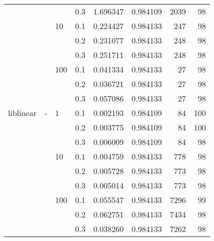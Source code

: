\begin{table}[H]
\begin{tabular}{llllrrrr}
          &   &     & 0.3 &  1.696347 &  0.984109 &    2039 &    98 \\
          &   & 10  & 0.1 &  0.224427 &  0.984133 &     247 &    98 \\
          &   &     & 0.2 &  0.231077 &  0.984133 &     248 &    98 \\
          &   &     & 0.3 &  0.251711 &  0.984133 &     248 &    98 \\
          &   & 100 & 0.1 &  0.041334 &  0.984133 &      27 &    98 \\
          &   &     & 0.2 &  0.036721 &  0.984133 &      27 &    98 \\
          &   &     & 0.3 &  0.057086 &  0.984133 &      27 &    98 \\
liblinear & - & 1   & 0.1 &  0.002193 &  0.984109 &      84 &   100 \\
          &   &     & 0.2 &  0.003775 &  0.984109 &      84 &   100 \\
          &   &     & 0.3 &  0.006009 &  0.984109 &      84 &    98 \\
          &   & 10  & 0.1 &  0.004759 &  0.984133 &     778 &    98 \\
          &   &     & 0.2 &  0.005728 &  0.984133 &     773 &    98 \\
          &   &     & 0.3 &  0.005014 &  0.984133 &     773 &    98 \\
          &   & 100 & 0.1 &  0.055547 &  0.984133 &    7296 &    99 \\
          &   &     & 0.2 &  0.062751 &  0.984133 &    7434 &    98 \\
          &   &     & 0.3 &  0.038260 &  0.984133 &    7262 &    98 \\
\bottomrule
\end{tabular}
\end{table}
